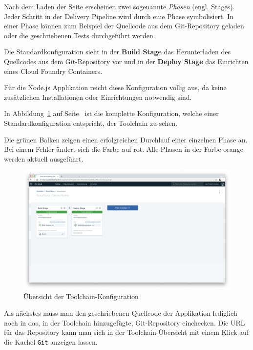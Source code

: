 Nach dem Laden der Seite erscheinen zwei sogenannte \textit{Phasen} (engl. Stages). Jeder Schritt in der Delivery
Pipeline wird durch eine Phase symbolisiert. In einer Phase können zum Beispiel der Quellcode aus dem Git-Repository
geladen oder die geschriebenen Tests durchgeführt werden.

Die Standardkonfiguration sieht in der \textbf{Build Stage} das Herunterladen des Quellcodes aus dem Git-Repository vor
und in der \textbf{Deploy Stage} das Einrichten eines Cloud Foundry Containers.

Für die Node.js Applikation reicht diese Konfiguration völlig aus, da keine zusätzlichen Installationen oder
Einrichtungen notwendig sind.

In Abbildung~\ref{fig:umsetzung_toolchain_pipeline} auf Seite~\pageref{fig:umsetzung_toolchain_pipeline} ist die
komplette Konfiguration, welche einer Standardkonfiguration entspricht, der Toolchain zu sehen.

Die grünen Balken zeigen einen erfolgreichen Durchlauf einer einzelnen Phase an. Bei einem Fehler ändert sich die Farbe
auf rot. Alle Phasen in der Farbe orange werden aktuell ausgeführt.

\begin{figure}[h]
    \centering
    \includegraphics[width=\textwidth]{images/kapitel_3/toolchain_pipeline.png}
    \caption{Übersicht der Toolchain-Konfiguration}
    \label{fig:umsetzung_toolchain_pipeline}
\end{figure}

Als nächstes muss man den geschriebenen Quellcode der Applikation lediglich noch in das, in der Toolchain hinzugefügte,
Git-Repository einchecken. Die URL für das Repository kann man sich in der Toolchain-Übersicht mit einem Klick auf die
Kachel \texttt{Git} anzeigen lassen.

